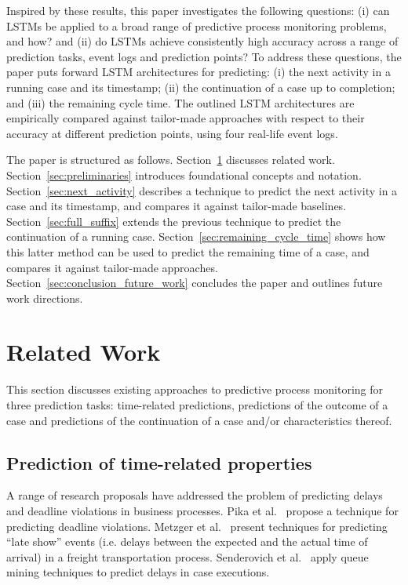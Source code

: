 \documentclass[runningheads,a4paper]{llncs}
\begin{document}
Inspired by these results, this paper investigates the following questions: (i) can LSTMs be applied to a broad range of predictive process monitoring problems, and how? and (ii) do LSTMs achieve consistently high accuracy across a range of prediction tasks, event logs and prediction points?
To address these questions, the paper puts forward LSTM architectures for predicting: (i) the next activity in a running case and its timestamp; (ii) the continuation of a case up to completion; and (iii) the remaining cycle time. The outlined LSTM architectures are empirically compared against tailor-made approaches with respect to their accuracy at different prediction points, using four real-life event logs. 





The paper is structured as follows. Section~\ref{sec:related_work} discusses related work. Section~\ref{sec:preliminaries} introduces foundational concepts and notation. Section~\ref{sec:next_activity} describes a technique to predict the next activity in a case and its timestamp, and compares it against tailor-made baselines. Section~\ref{sec:full_suffix} extends the previous technique to predict the continuation of a running case. Section~\ref{sec:remaining_cycle_time} shows how this latter method can be used to predict the remaining time of a case, and compares it against tailor-made approaches. Section~\ref{sec:conclusion_future_work} concludes the paper and outlines future work directions. 
\section{Related Work}
\label{sec:related_work}


This section discusses existing approaches to predictive process monitoring for three prediction tasks: time-related predictions, predictions of the outcome of a case and predictions of the continuation of a case and/or characteristics thereof.

\subsection{Prediction of time-related properties}


A range of research proposals have addressed the problem of predicting delays and deadline violations in business processes. Pika et al.~\cite{Pika2012} propose a technique for predicting deadline violations. Metzger et al.~\cite{Metzger2012,MetzgerLISFCDP15} present techniques for predicting ``late show'' events (i.e. delays between the expected and the actual time of arrival) in a freight transportation process. Senderovich et al.~\cite{Senderovich2014} apply queue mining techniques to predict delays in case executions. 
\end{document}
